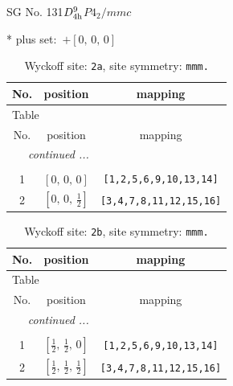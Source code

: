 \documentclass[fleqn,8pt]{jsarticle}
\begin{document}
\setcounter{MaxMatrixCols}{32}

\renewcommand{\tablename}{Table~}
\renewcommand{\figurename}{Figure~}
\begin{center}
\LARGE
SG No. 131\quad$D_{\rm 4h}^{9}$\quad$P4_2/mmc$\quad[ tetragonal ]
\end{center}
* plus set:\,\,\,$+\left[ 0,\, 0,\, 0 \right]$
\renewcommand{\arraystretch}{1.2}
\begin{longtable}{ccc}
\caption{Wyckoff site: {\tt 2a}, site symmetry: {\tt mmm.}}
 \\
 \hline \hline
No. & position & mapping \\ \hline \endfirsthead

\multicolumn{2}{l}{\tablename\ \thetable{}} \\
 \hline \hline
No. & position & mapping \\ \hline \endhead

 \hline \hline
\multicolumn{2}{r}{\footnotesize\it continued ...} \\ \endfoot

 \hline \hline
\multicolumn{2}{r}{} \\ \endlastfoot

1 & $\left[ 0,\, 0,\, 0 \right]$ & {\tt [1,2,5,6,9,10,13,14]} \\ \hline
2 & $\left[ 0,\, 0,\, \frac{1}{2} \right]$ & {\tt [3,4,7,8,11,12,15,16]} \\
\end{longtable}
\renewcommand{\arraystretch}{1.2}
\begin{longtable}{ccc}
\caption{Wyckoff site: {\tt 2b}, site symmetry: {\tt mmm.}}
 \\
 \hline \hline
No. & position & mapping \\ \hline \endfirsthead

\multicolumn{2}{l}{\tablename\ \thetable{}} \\
 \hline \hline
No. & position & mapping \\ \hline \endhead

 \hline \hline
\multicolumn{2}{r}{\footnotesize\it continued ...} \\ \endfoot

 \hline \hline
\multicolumn{2}{r}{} \\ \endlastfoot

1 & $\left[ \frac{1}{2},\, \frac{1}{2},\, 0 \right]$ & {\tt [1,2,5,6,9,10,13,14]} \\ \hline
2 & $\left[ \frac{1}{2},\, \frac{1}{2},\, \frac{1}{2} \right]$ & {\tt [3,4,7,8,11,12,15,16]} \\
\end{longtable}
\end{document}
